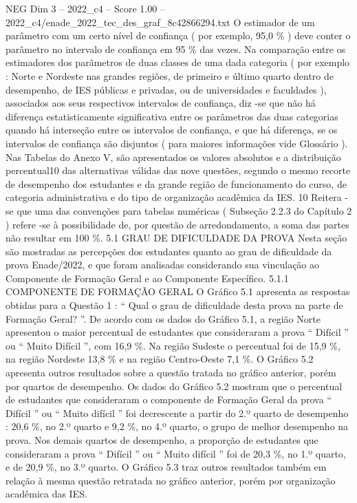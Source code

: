 \begin{textsample}{NEG Dim 3 – 2022\_c4 – Score 1.00 – 2022\_c4/enade\_2022\_tec\_des\_graf\_8c42866294.txt}
O estimador de um parâmetro com um certo nível de confiança ( por exemplo, 95,0 \% ) deve conter o parâmetro no intervalo de confiança em 95 \% das vezes.
Na comparação entre os estimadores dos parâmetros de duas classes de uma dada categoria ( por exemplo : Norte e Nordeste nas grandes regiões, de primeiro e último quarto dentro de desempenho, de IES públicas e privadas, ou de universidades e faculdades ), associados aos seus respectivos intervalos de confiança, diz -se que não há diferença estatisticamente significativa entre os parâmetros das duas categorias quando há interseção entre os intervalos de confiança, e que há diferença, se os intervalos de confiança são disjuntos ( para maiores informações vide Glossário ).
Nas Tabelas do Anexo V, são apresentados os valores absolutos e a distribuição percentual10 das alternativas válidas das nove questões, segundo o mesmo recorte de desempenho dos estudantes e da grande região de funcionamento do curso, de categoria administrativa e do tipo de organização acadêmica da IES. 10 Reitera -se que uma das convenções para tabelas numéricas ( Subseção 2.2.3 do Capítulo 2 ) refere -se à possibilidade de, por questão de arredondamento, a soma das partes não resultar em 100 \%. 5.1 GRAU DE DIFICULDADE DA PROVA Nesta seção são mostradas as percepções dos estudantes quanto ao grau de dificuldade da prova Enade/2022, e que foram analisadas considerando sua vinculação ao Componente de Formação Geral e ao Componente Específico. 5.1.1 COMPONENTE DE FORMAÇÃO GERAL O Gráfico 5.1 apresenta as respostas obtidas para a Questão 1 : “ Qual o grau de dificuldade desta prova na parte de Formação Geral? ”.
De acordo com os dados do Gráfico 5.1, a região Norte apresentou o maior percentual de estudantes que consideraram a prova “ Difícil ” ou “ Muito Difícil ”, com 16,9 \%.
Na região Sudeste o percentual foi de 15,9 \%, na região Nordeste 13,8 \% e na região Centro-Oeste 7,1 \%.
O Gráfico 5.2 apresenta outros resultados sobre a questão tratada no gráfico anterior, porém por quartos de desempenho.
Os dados do Gráfico 5.2 mostram que o percentual de estudantes que consideraram o componente de Formação Geral da prova “ Difícil ” ou “ Muito difícil ” foi decrescente a partir do 2.º quarto de desempenho : 20,6 \%, no 2.º quarto e 9,2 \%, no 4.º quarto, o grupo de melhor desempenho na prova.
Nos demais quartos de desempenho, a proporção de estudantes que consideraram a prova “ Difícil ” ou “ Muito difícil ” foi de 20,3 \%, no 1.º quarto, e de 20,9 \%, no 3.º quarto.
O Gráfico 5.3 traz outros resultados também em relação à mesma questão retratada no gráfico anterior, porém por organização acadêmica das IES.

\end{textsample}
